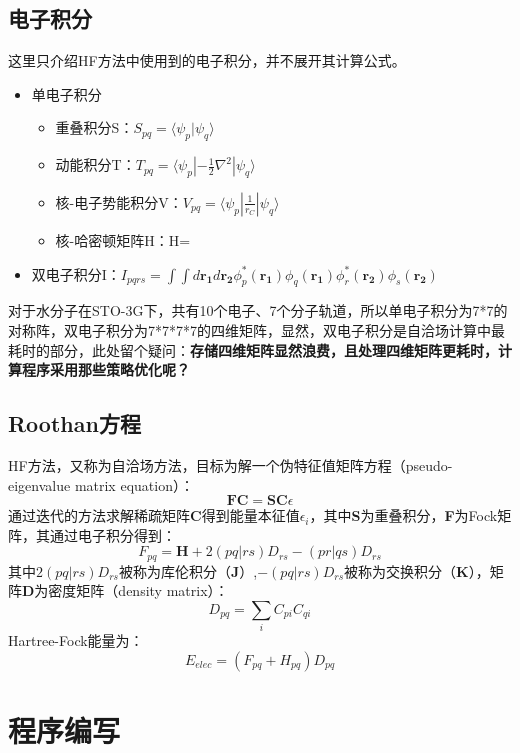 \documentclass[12pt, a4paper, oneside]{ctexart}
\begin{document}
\subsection{电子积分}
  这里只介绍HF方法中使用到的电子积分，并不展开其计算公式。
\begin{itemize}
  \item 单电子积分
  \begin{itemize}
    \item 重叠积分S：$S_{pq}=\langle\psi_p|\psi_q\rangle$
    \item 动能积分T：$T_{pq}=\langle\psi_p|-\frac{1}{2}\nabla^2|\psi_q\rangle$
    \item 核-电子势能积分V：$V_{pq}=\langle\psi_p|\frac{1}{r_C}|\psi_q\rangle$
	\item 核-哈密顿矩阵H：H=
  \end{itemize}
  \item 双电子积分I：$I_{pqrs} = \int \int d\mathbf{r_1} d\mathbf{r_2} \phi_p^*(\mathbf{r_1}) \phi_q(\mathbf{r_1}) \phi_r^*(\mathbf{r_2}) \phi_s(\mathbf{r_2})$
\end{itemize}
对于水分子在STO-3G下，共有10个电子、7个分子轨道，所以单电子积分为7*7的对称阵，双电子积分为7*7*7*7的四维矩阵，显然，双电子积分是自洽场计算中最耗时的部分，此处留个疑问：\textbf{存储四维矩阵显然浪费，且处理四维矩阵更耗时，计算程序采用那些策略优化呢？}
\subsection{Roothan方程}
  HF方法，又称为自洽场方法，目标为解一个伪特征值矩阵方程（pseudo-eigenvalue matrix equation）：
$$\mathbf{FC}=\mathbf{SC}\epsilon$$
通过迭代的方法求解稀疏矩阵\textbf{C}得到能量本征值$\epsilon_{i}$，其中\textbf{S}为重叠积分，\textbf{F}为Fock矩阵，其通过电子积分得到：
$$F_{pq}=\mathbf{H}+2(pq|rs)D_{rs}-(pr|qs)D_{rs}$$
其中$2(pq|rs)D_{rs}$被称为库伦积分（\textbf{J}）,$-(pq|rs)D_{rs}$被称为交换积分（\textbf{K}），矩阵\textbf{D}为密度矩阵（density matrix）：
$$D_{pq}=\sum_{i}C_{pi}C_{qi}$$
Hartree-Fock能量为：
$$E_{elec}=\left(F_{pq}+H_{pq}\right)D_{pq}$$

\newpage

\section{程序编写}
\end{document}
